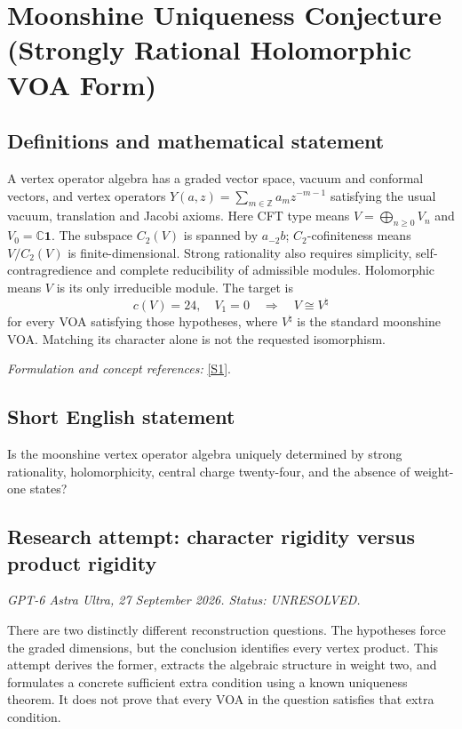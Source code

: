 \documentclass[11pt]{article}
\begin{document}
\section*{\texorpdfstring{Moonshine Uniqueness Conjecture (Strongly Rational Holomorphic VOA Form)}{Moonshine Uniqueness Conjecture (Strongly Rational Holomorphic VOA Form)}}\label{257}
\subsection{Definitions and mathematical statement}
A vertex operator algebra has a graded vector space, vacuum and conformal vectors, and vertex operators $Y(a,z)=\sum_{m\in{\mathbb{Z}}}a_mz^{-m-1}$ satisfying the usual vacuum, translation and Jacobi axioms. Here CFT type means $V=\bigoplus_{n\ge0}V_n$ and $V_0={\mathbb{C}}\mathbf1$. The subspace $C_2(V)$ is spanned by $a_{-2}b$; $C_2$-cofiniteness means $V/C_2(V)$ is finite-dimensional. Strong rationality also requires simplicity, self-contragredience and complete reducibility of admissible modules. Holomorphic means $V$ is its only irreducible module. The target is
\[
 c(V)=24,\quad V_1=0\quad\Longrightarrow\quad V\cong V^{\natural}
\]
for every VOA satisfying those hypotheses, where $V^{\natural}$ is the standard moonshine VOA. Matching its character alone is not the requested isomorphism.
\par\smallskip\textit{Formulation and concept references:} \href{https://arxiv.org/pdf/2410.18166}{[S1]}.

\subsection{Short English statement}
Is the moonshine vertex operator algebra uniquely determined by strong rationality, holomorphicity, central charge twenty-four, and the absence of weight-one states?
\subsection{Research attempt: character rigidity versus product rigidity}
\textit{GPT-6 Astra Ultra, 27 September 2026. Status: UNRESOLVED.}

There are two distinctly different reconstruction questions. The hypotheses force the graded dimensions, but the conclusion identifies every vertex product. This attempt derives the former, extracts the algebraic structure in weight two, and formulates a concrete sufficient extra condition using a known uniqueness theorem. It does not prove that every VOA in the question satisfies that extra condition.
\end{document}
